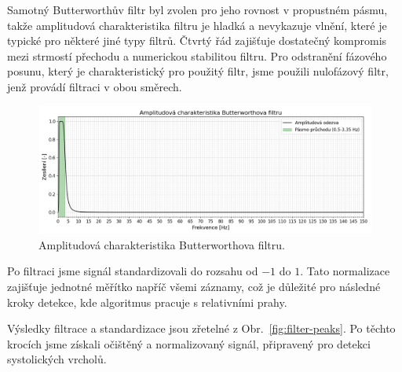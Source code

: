 Samotný Butterworthův filtr byl zvolen pro jeho rovnost v propustném pásmu, takže amplitudová charakteristika filtru je hladká a nevykazuje vlnění, které je typické pro některé jiné typy filtrů.
Čtvrtý řád zajišťuje dostatečný kompromis mezi strmostí přechodu a numerickou stabilitou filtru.
Pro odstranění fázového posunu, který je charakteristický pro použitý filtr, jsme použili nulofázový filtr, jenž provádí filtraci v obou směrech.

\begin{figure}[h]
	\label{fig:my_AFC}
	\centering
	\includegraphics[width=1\textwidth]{./obrazky/My_AFC.png}
	\vspace{-5mm}
	\caption[Vlastní amplitudová charakteristika Butterworthova filtru]{Amplitudová charakteristika Butterworthova filtru.}
	\vspace{-5mm}
\end{figure}

Po filtraci jsme signál standardizovali do rozsahu od \(-1\) do \(1\).
Tato normalizace zajišťuje jednotné měřítko napříč všemi záznamy, což je důležité pro následné kroky detekce, kde algoritmus pracuje s relativními prahy.

Výsledky filtrace a standardizace jsou zřetelné z Obr.~\ref{fig:filter-peaks}.
Po těchto krocích jsme získali očištěný a normalizovaný signál, připravený pro detekci systolických vrcholů.

